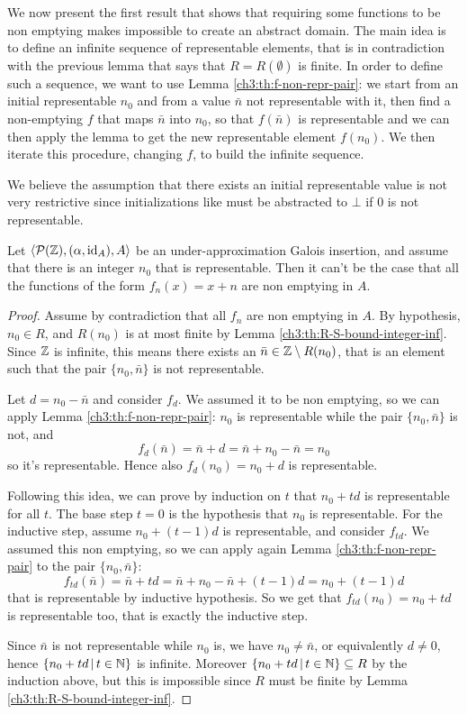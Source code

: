 We now present the first result that shows that requiring some functions to be non emptying makes impossible to create an abstract domain. The main idea is to define an infinite sequence of representable elements, that is in contradiction with the previous lemma that says that $R = R(\emptyset)$ is finite.
In order to define such a sequence, we want to use Lemma \ref{ch3:th:f-non-repr-pair}: we start from an initial representable $n_0$ and from a value $\bar{n}$ not representable with it, then find a non-emptying $f$ that maps $\bar{n}$ into $n_0$, so that $f(\bar{n})$ is representable and we can then apply the lemma to get the new representable element $f(n_0)$. We then iterate this procedure, changing $f$, to build the infinite sequence.

We believe the assumption that there exists an initial representable value is not very restrictive since initializations like  must be abstracted to $\bot$ if $0$ is not representable.

\begin{prop}\label{ch3:th:ne-sum-nonexsistence-inf}
	Let $\langle \mathcal{P}(\mathbb{Z}), (\alpha, \text{id}_{A}), A \rangle$ be an under-approximation Galois insertion, and assume that there is an integer $n_0$ that is representable. Then it can't be the case that all the functions of the form $f_n(x) = x + n$ are non emptying in $A$.
\end{prop}

\begin{proof}
	Assume by contradiction that all $f_n$ are non emptying in $A$.
	By hypothesis, $n_0 \in R$, and $R(n_0)$ is at most finite by Lemma \ref{ch3:th:R-S-bound-integer-inf}. Since $\mathbb{Z}$ is infinite, this means there exists an $\bar{n} \in \mathbb{Z} \setminus R(n_0)$, that is an element such that the pair $\{ n_0, \bar{n} \}$ is not representable.

	Let $d = n_0 - \bar{n}$ and consider $f_d$. We assumed it to be non emptying, so we can apply Lemma \ref{ch3:th:f-non-repr-pair}: $n_0$ is representable while the pair $\{ n_0, \bar{n} \}$ is not, and
	\[
	f_d(\bar{n}) = \bar{n} + d = \bar{n} + n_0 - \bar{n} = n_0
	\]
	so it's representable. Hence also $f_d(n_0) = n_0 + d$ is representable.

	Following this idea, we can prove by induction on $t$ that $n_0 + t d$ is representable for all $t$. The base step $t = 0$ is the hypothesis that $n_0$ is representable.
	For the inductive step, assume $n_0 + (t - 1) d$ is representable, and consider $f_{t d}$. We assumed this non emptying, so we can apply again Lemma \ref{ch3:th:f-non-repr-pair} to the pair $\{ n_0, \bar{n} \}$:
	\[
	f_{t d}(\bar{n}) = \bar{n} + t d = \bar{n} + n_0 - \bar{n} + (t - 1) d = n_0 + (t - 1) d
	\]
	that is representable by inductive hypothesis. So we get that $f_{t d}(n_0) = n_0 + t d$ is representable too, that is exactly the inductive step.

	Since $\bar{n}$ is not representable while $n_0$ is, we have $n_0 \neq \bar{n}$, or equivalently $d \neq 0$, hence $\{ n_0 + t d \,\vert\, t \in \mathbb{N} \}$ is infinite.
	Moreover $\{ n_0 + t d \,\vert\, t \in \mathbb{N} \} \subseteq R$ by the induction above, but this is impossible since $R$ must be finite by Lemma \ref{ch3:th:R-S-bound-integer-inf}.
\end{proof}

